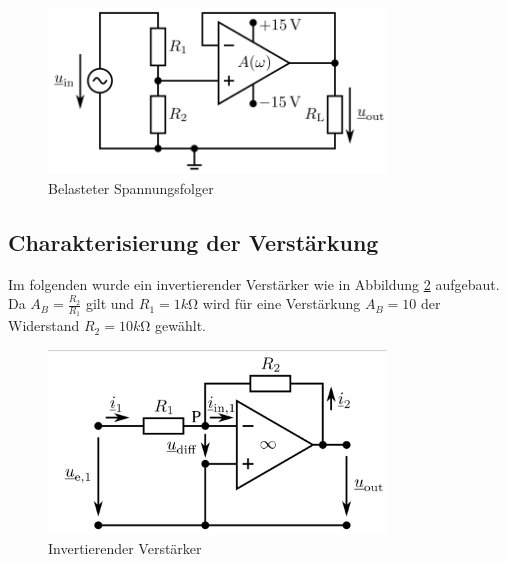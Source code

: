 \documentclass[a4paper]{article}
\begin{document}
\begin{figure}[H]
    \centering
    \includegraphics[width=0.8\textwidth]{versuch1/aufbau-spannungsfolger.png}
    \caption{Belasteter Spannungsfolger}
    \label{fig:versuch1-spannungsfolger-aufbau-spannungsfolger}
\end{figure}

\subsection{Charakterisierung der Verstärkung}
\label{subsec:versuch2-verstaerkung}

Im folgenden wurde ein invertierender Verstärker wie in Abbildung \ref{fig:versuch2-aufbau} aufgebaut.
Da $A_B=\frac{R_2}{R_1}$ gilt und $R_1=1\si{k\ohm}$ wird für eine Verstärkung $A_B=10$ der Widerstand $R_2=10\si{k\ohm}$ gewählt.

\begin{figure}[H]
    \centering
    \includegraphics[width=0.8\textwidth]{versuch2/aufgabe2.png}
    \caption{Invertierender Verstärker}
    \label{fig:versuch2-aufbau}
\end{figure}
\end{document}

